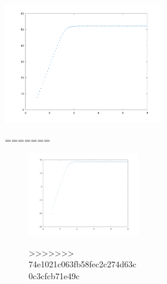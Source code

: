 \begin{figure} [!htb]
\begin{figure} [!htb]
\begin{figure} [!htb] 
  \includegraphics[width=\linewidth]{GAINVERDADEIRO.png}
  \caption{Amplifier circuit}
  \label{fig:theoplots}
  \endminipage\hfill
=======
\FloatBarrier
\begin{figure}
  \includegraphics{GAIN_Exprimental_R3_a_0.png}
  \caption{}
  \label{}
>>>>>>> 74e1021c063fb58fec2c274d63c0c3cfcb71e49c
\end{figure}


\end{figure}
\end{figure}
\end{figure}
